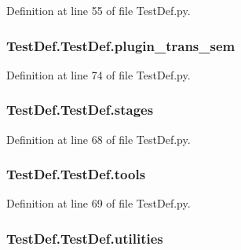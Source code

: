 Definition at line 55 of file Test\-Def.\-py.

\hypertarget{classTestDef_1_1TestDef_ac4a745e8b2151d1eed56e04770562eb9}{
\subsubsection[{plugin\-\_\-trans\-\_\-sem}]{\setlength{\rightskip}{0pt plus 5cm}Test\-Def.\-Test\-Def.\-plugin\-\_\-trans\-\_\-sem}}\label{classTestDef_1_1TestDef_ac4a745e8b2151d1eed56e04770562eb9}


Definition at line 74 of file Test\-Def.\-py.

\hypertarget{classTestDef_1_1TestDef_a9e15c13bd0cc9b1567c94f847118432e}{
\subsubsection[{stages}]{\setlength{\rightskip}{0pt plus 5cm}Test\-Def.\-Test\-Def.\-stages}}\label{classTestDef_1_1TestDef_a9e15c13bd0cc9b1567c94f847118432e}


Definition at line 68 of file Test\-Def.\-py.

\hypertarget{classTestDef_1_1TestDef_a2414cc1583555b0c758e0f9f0952a787}{
\subsubsection[{tools}]{\setlength{\rightskip}{0pt plus 5cm}Test\-Def.\-Test\-Def.\-tools}}\label{classTestDef_1_1TestDef_a2414cc1583555b0c758e0f9f0952a787}


Definition at line 69 of file Test\-Def.\-py.

\hypertarget{classTestDef_1_1TestDef_a0b9ea6f06c02401ad62e06c4cfd80bd2}{
\subsubsection[{utilities}]{\setlength{\rightskip}{0pt plus 5cm}Test\-Def.\-Test\-Def.\-utilities}}\label{classTestDef_1_1TestDef_a0b9ea6f06c02401ad62e06c4cfd80bd2}



